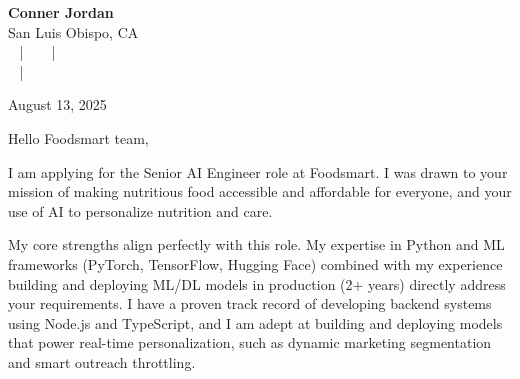 \documentclass[letterpaper,11pt]{article}
\begin{document}
\begin{center}
  {\Huge \textbf{Conner Jordan}}\\[4pt]
  {\Large San Luis Obispo, CA}\\[4pt]
  \href{tel:+18059759793}{
    } ~ | ~
  \href{mailto:connercharlesjordan@gmail.com}{
    } ~ | ~
   \\
  \href{https://www.linkedin.com/in/conner-jordan-4b268514a/}{
    } ~ | ~
  \href{https://github.com/cjordan223}{
    }
\end{center}



\vspace{16pt}

\begin{flushright}
August 13, 2025
\end{flushright}

Hello Foodsmart team,

\vspace{16pt}

I am applying for the Senior AI Engineer role at Foodsmart. I was drawn to your mission of making nutritious food accessible and affordable for everyone, and your use of AI to personalize nutrition and care.

\vspace{16pt}

My core strengths align perfectly with this role.  My expertise in Python and ML frameworks (PyTorch, TensorFlow, Hugging Face) combined with my experience building and deploying ML/DL models in production (2+ years) directly address your requirements. I have a proven track record of developing backend systems using Node.js and TypeScript, and I am adept at building and deploying models that power real-time personalization, such as dynamic marketing segmentation and smart outreach throttling.

\vspace{16pt}
\end{document}

